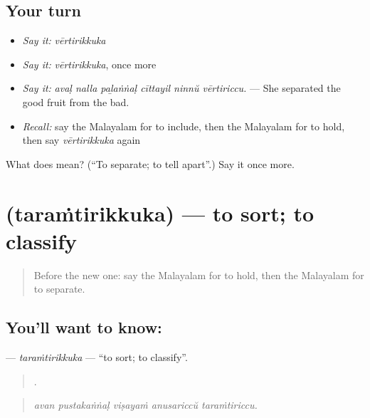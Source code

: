 \subsection*{Your turn}
\begin{itemize}
\raggedright
  \item \emph{Say it:} \emph{vērtirikkuka}
  \item \emph{Say it:} \emph{vērtirikkuka}, once more
  \item \emph{Say it:} \emph{avaḷ nalla paḻaṅṅaḷ cīttayil ninnŭ vērtiriccu.} — She separated the good fruit from the bad.
  \item \emph{Recall:} say the Malayalam for to include, then the Malayalam for to hold, then say \emph{vērtirikkuka} again
\end{itemize}

\begin{tcolorbox}[breakable,colback=teal!4,colframe=teal!35!black,title={Before you move on}]
What does  mean? (\textquotedblleft{}To separate; to tell apart\textquotedblright{}.) Say it once more.
\end{tcolorbox}
\section[\texorpdfstring{\ml{തരംതിരിക്കുക} (taraṁtirikkuka)}{തരംതിരിക്കുക (taraṁtirikkuka)}]{ (taraṁtirikkuka) — to sort; to classify}

\label{lesson:ML-C456-taramtirikkuka}



\begin{quote}
Before the new one: say the Malayalam for to hold, then the Malayalam for to separate.
\end{quote}

\subsection*{You'll want to know: }
\textbf{} — \emph{taraṁtirikkuka} — \textquotedblleft{}to sort; to classify\textquotedblright{}.

\begin{quote}
    .
\end{quote}

\begin{quote}
\emph{avan pustakaṅṅaḷ viṣayaṁ anusariccŭ taraṁtiriccu.}
\end{quote}

